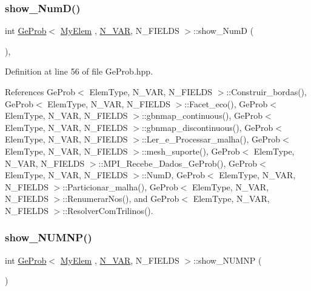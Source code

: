\subsubsection{\texorpdfstring{show\+\_\+\+Num\+D()}{show\_NumD()}}
{\footnotesize\ttfamily int \hyperlink{classGeProb}{Ge\+Prob}$<$ \hyperlink{DG__Prob_8h_a83cd887ced9a6587428f267e50cd4787}{My\+Elem} , \hyperlink{classED__Prob_a4e7d2ff1a8e435e336fb00c527224b5a}{N\+\_\+\+V\+AR}, N\+\_\+\+F\+I\+E\+L\+DS $>$\+::show\+\_\+\+NumD (\begin{DoxyParamCaption}{ }\end{DoxyParamCaption})\hspace{0.3cm}{\ttfamily [inline]}, {\ttfamily [inherited]}}



Definition at line 56 of file Ge\+Prob.\+hpp.



References Ge\+Prob$<$ Elem\+Type, N\+\_\+\+V\+A\+R, N\+\_\+\+F\+I\+E\+L\+D\+S $>$\+::\+Construir\+\_\+bordas(), Ge\+Prob$<$ Elem\+Type, N\+\_\+\+V\+A\+R, N\+\_\+\+F\+I\+E\+L\+D\+S $>$\+::\+Facet\+\_\+eco(), Ge\+Prob$<$ Elem\+Type, N\+\_\+\+V\+A\+R, N\+\_\+\+F\+I\+E\+L\+D\+S $>$\+::gbnmap\+\_\+continuous(), Ge\+Prob$<$ Elem\+Type, N\+\_\+\+V\+A\+R, N\+\_\+\+F\+I\+E\+L\+D\+S $>$\+::gbnmap\+\_\+discontinuous(), Ge\+Prob$<$ Elem\+Type, N\+\_\+\+V\+A\+R, N\+\_\+\+F\+I\+E\+L\+D\+S $>$\+::\+Ler\+\_\+e\+\_\+\+Processar\+\_\+malha(), Ge\+Prob$<$ Elem\+Type, N\+\_\+\+V\+A\+R, N\+\_\+\+F\+I\+E\+L\+D\+S $>$\+::mesh\+\_\+suporte(), Ge\+Prob$<$ Elem\+Type, N\+\_\+\+V\+A\+R, N\+\_\+\+F\+I\+E\+L\+D\+S $>$\+::\+M\+P\+I\+\_\+\+Recebe\+\_\+\+Dados\+\_\+\+Ge\+Prob(), Ge\+Prob$<$ Elem\+Type, N\+\_\+\+V\+A\+R, N\+\_\+\+F\+I\+E\+L\+D\+S $>$\+::\+NumD, Ge\+Prob$<$ Elem\+Type, N\+\_\+\+V\+A\+R, N\+\_\+\+F\+I\+E\+L\+D\+S $>$\+::\+Particionar\+\_\+malha(), Ge\+Prob$<$ Elem\+Type, N\+\_\+\+V\+A\+R, N\+\_\+\+F\+I\+E\+L\+D\+S $>$\+::\+Renumerar\+Nos(), and Ge\+Prob$<$ Elem\+Type, N\+\_\+\+V\+A\+R, N\+\_\+\+F\+I\+E\+L\+D\+S $>$\+::\+Resolver\+Com\+Trilinos().

\mbox{\label{classGeProb_a9470702789ccb98b8c952d3259bcba7f}} 
\subsubsection{\texorpdfstring{show\+\_\+\+N\+U\+M\+N\+P()}{show\_NUMNP()}}
{\footnotesize\ttfamily int \hyperlink{classGeProb}{Ge\+Prob}$<$ \hyperlink{DG__Prob_8h_a83cd887ced9a6587428f267e50cd4787}{My\+Elem} , \hyperlink{classED__Prob_a4e7d2ff1a8e435e336fb00c527224b5a}{N\+\_\+\+V\+AR}, N\+\_\+\+F\+I\+E\+L\+DS $>$\+::show\+\_\+\+N\+U\+M\+NP (\begin{DoxyParamCaption}{ }\end{DoxyParamCaption})\hspace{0.3cm}{\ttfamily [inherited]}}



